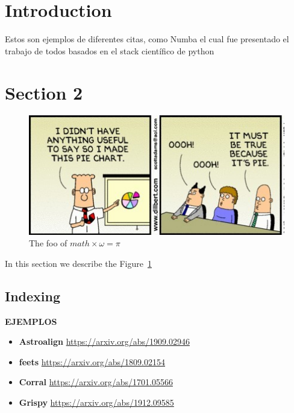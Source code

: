 \documentclass[final,5p,times,twocolumn]{elsarticle}
\begin{document}



\section{Introduction}

Estos son ejemplos de diferentes citas, como Numba el cual fue presentado el trabajo de \citet{lam2015numba} todos basados en el stack científico de python \citep{VanDerWalt2011, scikit-learn}



\section{Section 2}

\begin{figure}
\includegraphics[width=\columnwidth]{./plots/dilbert.jpg}
\caption{The foo of $math \times \omega = \pi$}
\label{fig:fig1}
\end{figure}

In this section we describe  the Figure~\ref{fig:fig1}


\subsection{Indexing}

\textbf{EJEMPLOS }

\begin{itemize}
    \item \textbf{Astroalign} \url{https://arxiv.org/abs/1909.02946}
    \item \textbf{feets} \url{https://arxiv.org/abs/1809.02154}
    \item \textbf{Corral} \url{https://arxiv.org/abs/1701.05566}
    \item \textbf{Grispy} \url{https://arxiv.org/abs/1912.09585}
\end{itemize}
\end{document}
